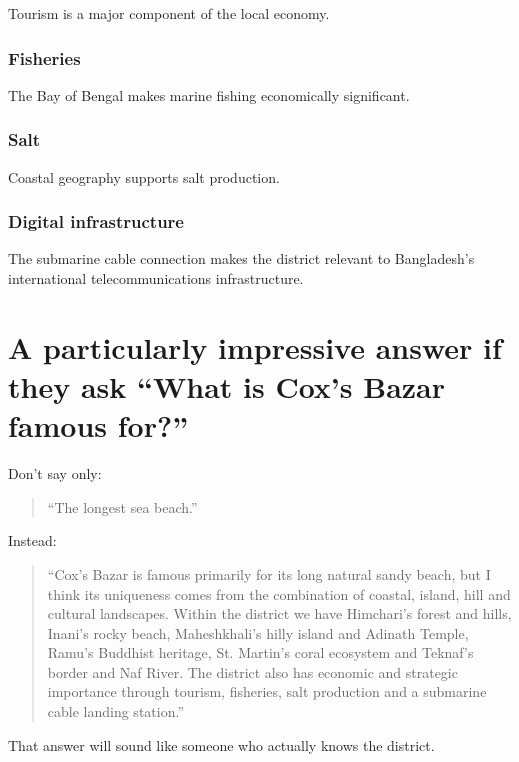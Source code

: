Tourism is a major component of the local economy.

\subsubsection{Fisheries}

The Bay of Bengal makes marine fishing economically significant.

\subsubsection{Salt}

Coastal geography supports salt production.

\subsubsection{Digital infrastructure}

The submarine cable connection makes the district relevant to Bangladesh's international telecommunications infrastructure.

\medskip

\section{A particularly impressive answer if they ask ``What is Cox's Bazar famous for?''}

Don't say only:

\begin{quote}
``The longest sea beach.''\\
\end{quote}

Instead:

\begin{quote}
``Cox's Bazar is famous primarily for its long natural sandy beach, but I think its uniqueness comes from the combination of coastal, island, hill and cultural landscapes. Within the district we have Himchari's forest and hills, Inani's rocky beach, Maheshkhali's hilly island and Adinath Temple, Ramu's Buddhist heritage, St. Martin's coral ecosystem and Teknaf's border and Naf River. The district also has economic and strategic importance through tourism, fisheries, salt production and a submarine cable landing station.''\\
\end{quote}

That answer will sound like someone who actually knows the district.

